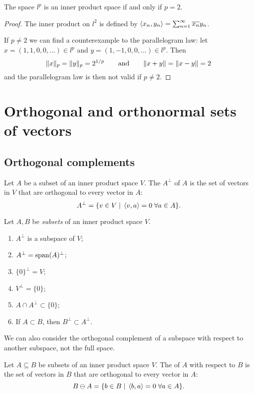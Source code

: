 \begin{corollary}
The space $l^p$ is an inner product space \textup{if and only if} $p=2$.
\end{corollary}
\begin{proof}
The inner product on $l^2$ is defined by $\left\langle x_n, y_n \right\rangle = \sum_{n=1}^\infty \overline{x_n}y_n$.

If $p\neq 2$ we can find a counterexample to the parallelogram law: let $x=(1,1,0,0,\ldots)\in l^p$ and $y = (1,-1,0,0,\ldots)\in l^p$. Then
\[ \lVert x\rVert_p = \lVert y\rVert_p = 2^{1/p} \qquad \text{and} \qquad \lVert x+y\rVert = \lVert x-y\rVert = 2 \]
and the parallelogram law is then not valid if $p\neq 2$.
\end{proof}

\section{Orthogonal and orthonormal sets of vectors}
\subsection{Orthogonal complements}
\begin{definition}
Let $A$ be a subset of an inner product space $V$. The  $A^\perp$ of $A$ is the set of vectors in $V$ that are orthogonal to every vector in $A$:
\[ A^\perp = \{ v\in V\;|\; \left\langle v,a \right\rangle=0\; \forall a\in A \}. \]
\end{definition}

\begin{proposition} \label{OrthogonalComplementProperties}
Let $A,B$ be \emph{subsets} of an inner product space $V$.
\begin{enumerate}
\item $A^\perp$ is a subspace of $V$;
\item $A^\perp = \operatorname{span}(A)^\perp$;
\item $\{0\}^\perp = V$;
\item $V^\perp = \{0\}$;
\item $A\cap A^\perp \subset \{0\}$;
\item If $A\subset B$, then $B^\perp \subset A^\perp$.
\end{enumerate}
\end{proposition}

We can also consider the orthogonal complement of a subspace with respect to another subspace, not the full space.
\begin{definition}
Let $A\subseteq B$ be subsets of an inner product space $V$. The  of $A$ with respect to $B$ is the set of vectors in $B$ that are orthogonal to every vector in $A$:
\[ B\ominus A = \{ b\in B\;|\; \left\langle b,a \right\rangle=0\; \forall a\in A \}. \]
\end{definition}

